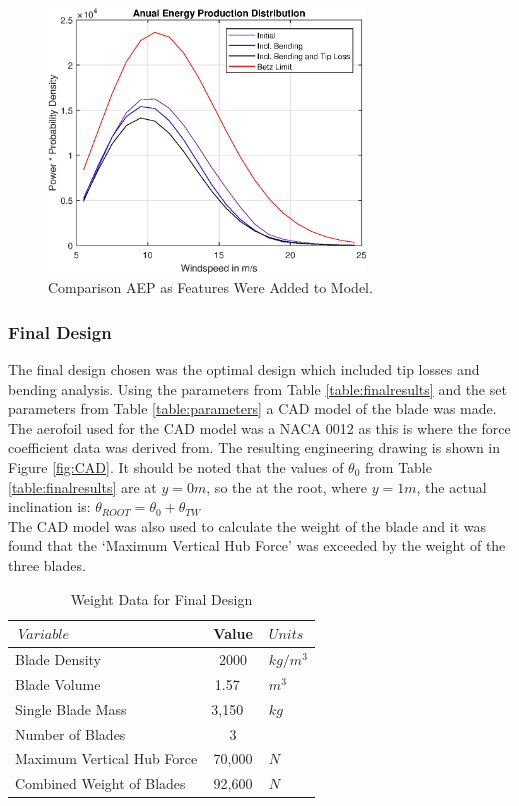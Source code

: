 \documentclass[11pt]{article}
\newcommand{\ra}[1]{\renewcommand{\arraystretch}{#1}}
\begin{document}
\begin{figure}[h!]
	\centering
	\includegraphics[width=0.75\textwidth]{AEPFinal}
	\caption{Comparison AEP as Features Were Added to Model.}\label{fig:finalcomp}
\end{figure}

\subsubsection{Final Design}

The final design chosen was the optimal design which included tip losses and bending analysis. Using the  parameters from Table \ref{table:finalresults} and the set parameters from Table \ref{table:parameters} a CAD model of the blade was made. The aerofoil used for the CAD model was a NACA 0012 as this is where the force coefficient data was derived from. The resulting engineering drawing is shown in Figure \ref{fig:CAD}. It should be noted that the values of $\theta_0$ from Table \ref{table:finalresults} are at $y = 0m$, so the at the root, where $y = 1m$, the actual inclination is: $\theta_{ROOT} = \theta_0 + \theta_{TW}$\\
The CAD model was also used to calculate the weight of the blade and it was found that the `Maximum Vertical Hub Force' was exceeded by the weight of the three blades.

\begin{table}[!h]
\centering %
\ra{1.3}
\begin{tabular}{@{}lcl@{}}\toprule
 $\ Variable \ $ & Value &  $Units $\\
\midrule
Blade Density &  2000 & $ kg/m^3$ \\
Blade Volume& 1.57 \ & $ m^3$ \ \\
Single Blade Mass & 3,150 \ & $ kg$ \ \\
Number of Blades & 3 & \\
\midrule
Maximum Vertical Hub Force & 70,000 & $N$ \\
Combined Weight of Blades &  92,600 & $N$ \\
\bottomrule
\end{tabular}
\caption{Weight Data for Final Design}
\label{table:weight}
\end{table}
\end{document}
